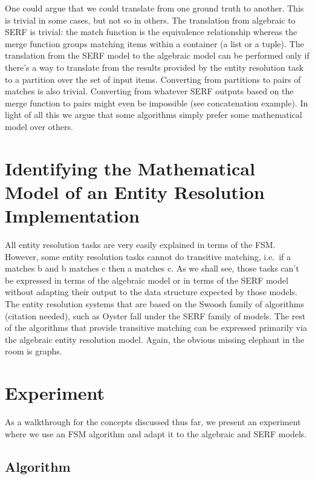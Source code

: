 \documentclass[11pt]{article}
\begin{document}
    One could argue that we could translate from one ground truth to another. This is trivial in some cases, but not so in others. The translation from algebraic to SERF is trivial: the match function is the equivalence relationship whereas the merge function groups matching items within a container (a list or a tuple). The translation from the SERF model to the algebraic model can be performed only if there's a way to translate from the results provided by the entity resolution task to a partition over the set of input items. Converting from partitions to pairs of matches is also trivial. Converting from whatever SERF outputs based on the merge function to pairs might even be impossible (see concatenation example). In light of all this we argue that some algorithms simply prefer some mathematical model over others.

    \section{Identifying the Mathematical Model of an Entity Resolution Implementation}\label{section:implementation}
    
    All entity resolution tasks are very easily explained in terms of the FSM\@. However, some entity resolution tasks cannot do transitive matching, i.e.\ if a matches b and b matches c then a matches c. 
    As we shall see, those tasks can't be expressed in terms of the algebraic model or in terms of the SERF model without adapting their output to the data structure expected by those models. The entity resolution systems that are based on the Swoosh family of algorithms (citation needed), such as Oyster fall under the SERF family of models. The rest of the algorithms that provide transitive matching can be expressed primarily via the algebraic entity resolution model. Again, the obvious missing elephant in the room is graphs.

    \section{Experiment}\label{section:experiment}

    As a walkthrough for the concepts discussed thus far, we present an experiment where we use an FSM algorithm and adapt it to the algebraic and SERF models.

    \subsection[algo]{Algorithm}\label{subsec:algorithm}
    
\end{document}
